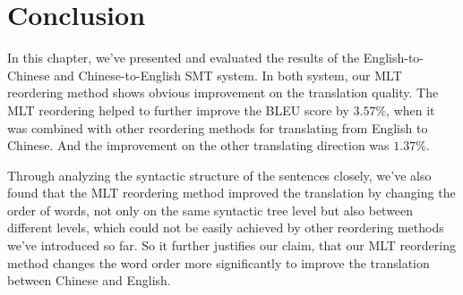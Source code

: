 \section{Conclusion}
\label{ch:Evaluation:sec:Conclusion}

In this chapter, we've presented and evaluated the results of the English-to-Chinese and Chinese-to-English SMT system. In both system, our MLT reordering method shows obvious improvement on the translation quality. The MLT reordering helped to further improve the BLEU score by $3.57\%$, when it was combined with other reordering methods for translating from English to Chinese. And the improvement on the other translating direction was $1.37\%$.

Through analyzing the syntactic structure of the sentences closely, we've also found that the MLT reordering method improved the translation by changing the order of words, not only on the same syntactic tree level but also between different levels, which could not be easily achieved by other reordering methods we've introduced so far. So it further justifies our claim, that our MLT reordering method changes the word order more significantly to improve the translation between Chinese and English.
